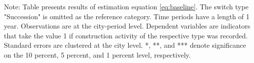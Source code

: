 \begin{table}[htbp]
\begin{tabular}{lcccc}
      
   \end{tabular}
   
   \par \raggedright 
   Note: Table presents results of estimation equation \eqref{eq:baseline}. The switch type "Succession" is omitted as the  reference category. Time periods have a length of 1 year. Observations are at the city-period  level. Dependent variables are indicators that take the value 1 if  construction activity of the respective type was recorded. Standard errors are  clustered at the city level. *, **, and *** denote significance on the 10 percent, 5 percent, and 1 percent  level, respectively.
\end{table}
